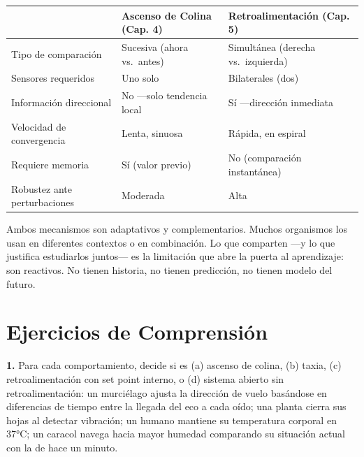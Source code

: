 \documentclass[
  letterpaper,
  DIV=11,
  numbers=noendperiod]{scrreprt}
\newcounter{none} %
\begin{document}
\begin{tcolorbox}[enhanced jigsaw, arc=.35mm, bottomrule=.15mm, breakable, colback=white, colframe=quarto-callout-note-color-frame, left=2mm, leftrule=.75mm, opacityback=0, rightrule=.15mm, toprule=.15mm]
{\def\LTcaptype{none} %
\begin{longtable}[]{@{}
  >{\raggedright\arraybackslash}p{}
  >{\raggedright\arraybackslash}p{}
  >{\raggedright\arraybackslash}p{}@{}}
\toprule\noalign{}
\begin{minipage}[b]{\linewidth}\raggedright
\end{minipage} & \begin{minipage}[b]{\linewidth}\raggedright
Ascenso de Colina (Cap. 4)
\end{minipage} & \begin{minipage}[b]{\linewidth}\raggedright
Retroalimentación (Cap. 5)
\end{minipage} \\
\midrule\noalign{}
\endhead
\bottomrule\noalign{}
\endlastfoot
Tipo de comparación & Sucesiva (ahora vs.~antes) & Simultánea (derecha
vs.~izquierda) \\
Sensores requeridos & Uno solo & Bilaterales (dos) \\
Información direccional & No ---solo tendencia local & Sí ---dirección
inmediata \\
Velocidad de convergencia & Lenta, sinuosa & Rápida, en espiral \\
Requiere memoria & Sí (valor previo) & No (comparación instantánea) \\
Robustez ante perturbaciones & Moderada & Alta \\
\end{longtable}
}

Ambos mecanismos son adaptativos y complementarios. Muchos organismos
los usan en diferentes contextos o en combinación. Lo que comparten ---y
lo que justifica estudiarlos juntos--- es la limitación que abre la
puerta al aprendizaje: son reactivos. No tienen historia, no tienen
predicción, no tienen modelo del futuro.

\section{Ejercicios de
Comprensión}\label{ejercicios-de-comprensiuxf3n-2}

\textbf{1.} Para cada comportamiento, decide si es (a) ascenso de
colina, (b) taxia, (c) retroalimentación con set point interno, o (d)
sistema abierto sin retroalimentación: un murciélago ajusta la dirección
de vuelo basándose en diferencias de tiempo entre la llegada del eco a
cada oído; una planta cierra sus hojas al detectar vibración; un humano
mantiene su temperatura corporal en 37°C; un caracol navega hacia mayor
humedad comparando su situación actual con la de hace un minuto.


\end{tcolorbox}
\end{document}
